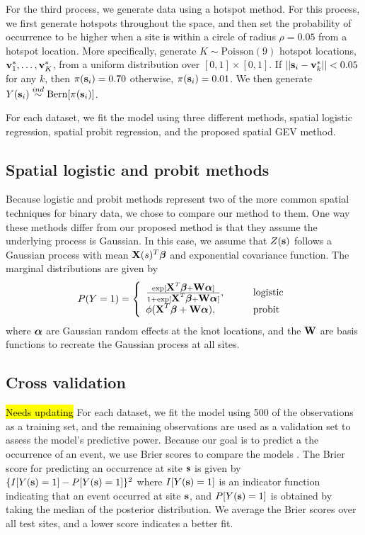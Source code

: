 \documentclass[11pt]{article}
\begin{document}
For the third process, we generate data using a hotspot method.
For this process, we first generate hotspots throughout the space, and then set the probability of occurrence to be higher when a site is within a circle of radius $\rho = 0.05$ from a hotspot location.
More specifically, generate $K \sim \text{Poisson}(9)$ hotspot locations, $\mbox{\bf v}^*_1, \ldots, \mbox{\bf v}^*_K$, from a uniform distribution over $[0, 1] \times [0, 1]$.
If $||\mbox{\bf s}_i - \mbox{\bf v}^*_k|| < 0.05$ for any $k$, then $\pi(\mbox{\bf s}_i) = 0.70$ otherwise, $\pi(\mbox{\bf s}_i) = 0.01$.
We then generate $Y(\mbox{\bf s}_i) \stackrel{ind}{\sim} \text{Bern}[\pi(\mbox{\bf s}_i)]$.

For each dataset, we fit the model using three different methods, spatial logistic regression, spatial probit regression, and the proposed spatial GEV method.

\subsection{Spatial logistic and probit methods}
Because logistic and probit methods represent two of the more common spatial techniques for binary data, we chose to compare our method to them.
One way these methods differ from our proposed method is that they assume the underlying process is Gaussian.
In this case, we assume that $Z(\mbox{\bf s})$ follows a Gaussian process with mean $\mbox{\bf X}(s)^T \mbox{\boldmath $\beta$}$ and exponential covariance function.
The marginal distributions are given by
\begin{align}
  P(Y = 1) = \left\{ \begin{array}{ll}
    \frac{\exp[\mbox{\bf X}^T \mbox{\boldmath $\beta$} + \mbox{\bf W} \mbox{\boldmath $\alpha$}]}{1 + \exp[\mbox{\bf X}^T \mbox{\boldmath $\beta$} + \mbox{\bf W} \mbox{\boldmath $\alpha$}]}, \qquad &\text{logistic}\\
    \phi(\mbox{\bf X}^T \mbox{\boldmath $\beta$} + \mbox{\bf W} \mbox{\boldmath $\alpha$}), \qquad &\text{probit}
  \end{array}\right.
\end{align}
where $\mbox{\boldmath $\alpha$}$ are Gaussian random effects at the knot locations, and the $\mbox{\bf W}$ are basis functions to recreate the Gaussian process at all sites.

\subsection{Cross validation}\label{rbs:modelselect}

\hl{Needs updating}
For each dataset, we fit the model using 500 of the observations as a training set, and the remaining observations are used as a validation set to assess the model's predictive power.
Because our goal is to predict a the occurrence of an event, we use Brier scores to compare the models \citep{Gneiting2007}.
The Brier score for predicting an occurrence at site $\mbox{\bf s}$ is given by $\{I[Y(\mbox{\bf s})=1] - P[Y(\mbox{\bf s})=1]\}^2$ where $I[Y(\mbox{\bf s}) = 1]$ is an indicator function indicating that an event occurred at site $\mbox{\bf s}$, and $P[Y(\mbox{\bf s}) = 1]$ is obtained by taking the median of the posterior distribution.
We average the Brier scores over all test sites, and a lower score indicates a better fit.
\end{document}
